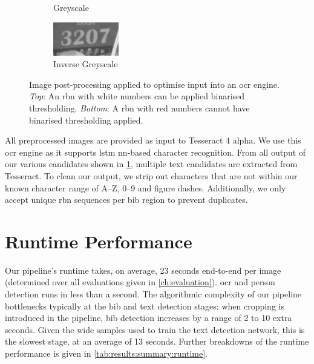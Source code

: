 \begin{figure}[h]
\begin{subfigure}[b]{0.23\textwidth}
    \caption{Greyscale}
  \end{subfigure}
  \hspace{\fill}
  \begin{subfigure}[b]{0.23\textwidth}
    \includegraphics[width=\textwidth]{images/processing/ocr/3207_bw_inv}
    \caption{Inverse Greyscale}
  \end{subfigure}
  \hspace{\fill}
  
  \caption[Image post-processing applied to optimise input into an OCR engine]{Image post-processing applied to optimise input into an \gls{ocr} engine. \textit{Top}: An \gls{rbn} with white numbers can be applied binarised thresholding. \textit{Bottom}: A \gls{rbn} with red numbers cannot have binarised thresholding applied.}
  \label{fig:processing_pipeline:ocr_postprocessing}
\end{figure}

All preprocessed images are provided as input to Tesseract 4 alpha. We use this \gls{ocr} engine as it supports \gls{lstm} \gls{nn}-based character recognition. From all output of our various candidates shown in \cref{fig:processing_pipeline:ocr_postprocessing}, multiple text candidates are extracted from Tesseract. To clean our output, we strip out characters that are not within our known character range of A--Z, 0--9 and figure dashes. Additionally, we only accept unique \gls{rbn} sequences per bib region to prevent duplicates.

\section{Runtime Performance}

Our pipeline's runtime takes, on average, 23 seconds end-to-end per image (determined over all evaluations given in \cref{ch:evaluation}). \gls{ocr} and person detection runs in less than a second. The algorithmic complexity of our pipeline bottlenecks typically at the bib and text detection stages: when cropping is introduced in the pipeline, bib detection increases by a range of 2 to 10 extra seconds. Given the wide samples used to train the text detection network, this is the slowest stage, at an average of 13 seconds. Further breakdowns of the runtime performance is given in \cref{tab:results:summary:runtime}.

